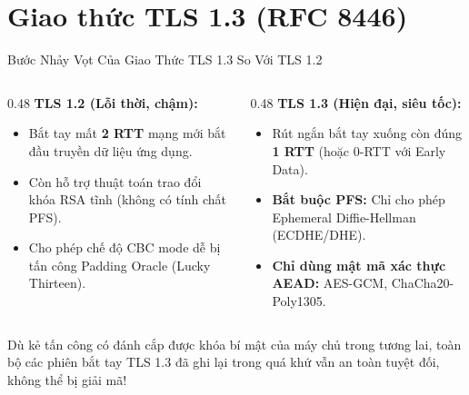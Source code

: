 \section{Giao thức TLS 1.3 (RFC 8446)}

\begin{frame}{Bước Nhảy Vọt Của Giao Thức TLS 1.3 So Với TLS 1.2}
  \begin{columns}[T]
    \begin{column}{0.48\textwidth}
      \textbf{TLS 1.2 (Lỗi thời, chậm):}
      \begin{itemize}\small
        \item Bắt tay mất \textbf{2 RTT} mạng mới bắt đầu truyền dữ liệu ứng dụng.
        \item Còn hỗ trợ thuật toán trao đổi khóa RSA tĩnh (không có tính chất PFS).
        \item Cho phép chế độ CBC mode dễ bị tấn công Padding Oracle (Lucky Thirteen).
      \end{itemize}
    \end{column}
    \begin{column}{0.48\textwidth}
      \textbf{TLS 1.3 (Hiện đại, siêu tốc):}
      \begin{itemize}\small
        \item Rút ngắn bắt tay xuống còn đúng \textbf{1 RTT} (hoặc 0-RTT với Early Data).
        \item \textbf{Bắt buộc PFS:} Chỉ cho phép Ephemeral Diffie-Hellman (ECDHE/DHE).
        \item \textbf{Chỉ dùng mật mã xác thực AEAD:} AES-GCM, ChaCha20-Poly1305.
      \end{itemize}
    \end{column}
  \end{columns}

  \begin{keybox}
    Dù kẻ tấn công có đánh cắp được khóa bí mật của máy chủ trong tương lai, toàn bộ các phiên bắt tay TLS 1.3 đã ghi lại trong quá khứ vẫn an toàn tuyệt đối, không thể bị giải mã!
  \end{keybox}
\end{frame}

